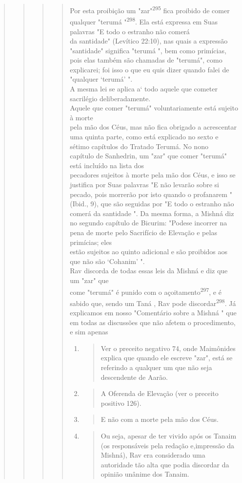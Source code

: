 \begin{quote}
\begin{quote}
\begin{quote}
\begin{quote}
Por esta proibição um "zar"\textsuperscript{295} fica proibido de comer
qualquer "terumá
"\textsuperscript{298}. Ela está expressa em Suas palavras "E todo o
estranho não comerá\\
da santidade" (Levítico 22:10), nas quais a expressão "santidade"
significa "terumá
", bem como primícias, pois elas também são chamadas de "terumá",
como
explicarei; foi isso o que eu quis dizer quando falei de "qualquer
`terumá' ".\\
A mesma lei se aplica a` todo aquele que cometer sacrilégio
deliberadamente.\\
Aquele que comer "terumá" voluntariamente está sujeito à morte\\
pela mão dos Céus, mas não fica obrigado a acrescentar uma quinta parte,
como
está explicado no sexto e sétimo capítulos do Tratado Terumá. No
nono\\
capítulo de Sanhedrin, um "zar" que comer "terumá" está incluído na
lista dos\\
pecadores sujeitos à morte pela mão dos Céus, e isso se justifica por
Suas palavras
"E não levarão sobre si pecado, pois morrerão por isto quando o
profanarem
" (Ibid., 9), que são seguidas por "E todo o estranho não comerá da
santidade
". Da mesma forma, a Mishná diz no segundo capítulo de Bicurim:
"Podese
incorrer na pena de morte pelo Sacrifício de Elevação e pelas
primícias; eles\\
estão sujeitos ao quinto adicional e são proibidos aos que não são
`Cohanim' ".\\
Rav discorda de todas essas leis da Mishná e diz que um "zar" que\\
come "terumá" é punido com o açoitamento\textsuperscript{297}, e é
sabido que, sendo um Taná
, Rav pode discordar\textsuperscript{298}. Já explicamos em nosso
"Comentário sobre a Mishná
" que em todas as discussões que não afetem o procedimento, e sim
apenas

\begin{enumerate}
\def\labelenumi{\arabic{enumi}.}
\setcounter{enumi}{294}
\item
 \begin{quote}
 Ver o preceito negativo 74, onde Maimônides explica que quando ele
 escreve "zar", está se referindo a qualquer um que não seja
 descendente de Aarão.
 \end{quote}
\item
 \begin{quote}
 A Oferenda de Elevação (ver o preceito positivo 126).
 \end{quote}
\item
 \begin{quote}
 E não com a morte pela mão dos Céus.
 \end{quote}
\item
 \begin{quote}
 Ou seja, apesar de ter vivido após os Tanaim (os responsáveis pela
 redação e,impressão da Mishná), Rav era considerado uma autoridade tão
 alta que podia discordar da opinião unânime dos Tanaim.
 \end{quote}
\end{enumerate}


\end{quote}
\end{quote}
\end{quote}
\end{quote}
